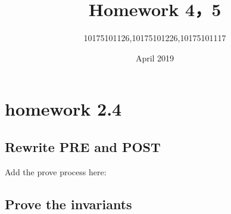 \documentclass[11pt,a4paper,fleqn]{article}
\title{Homework 4，5}
\author{10175101126,10175101226,10175101117}
\date{April 2019}
\begin{document}
\maketitle

\section{ homework 2.4 }
\subsection{Rewrite PRE and POST }
\noindent
Add the prove process here: \\



\subsection{Prove the invariants}
\noindent
\end{document}
